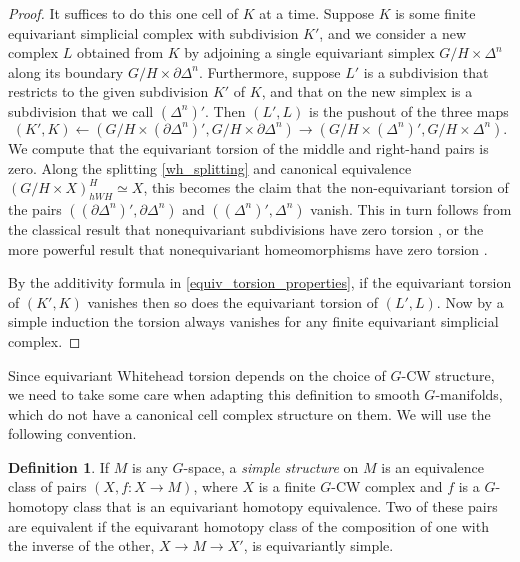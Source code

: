 \documentclass[11pt]{amsart}
\theoremstyle{definition}
\newtheorem{defn}{Definition}[section]
\numberwithin{equation}{section}
\numberwithin{figure}{section}
\newcommand{\ourdefn}[1]{{\it #1}}
\begin{document}
	\begin{proof}
		It suffices to do this one cell of $K$ at a time. Suppose $K$ is some finite equivariant simplicial complex with subdivision $K'$, and we consider a new complex $L$ obtained from $K$ by adjoining a single equivariant simplex $G/H \times \Delta^n$ along its boundary $G/H \times \partial \Delta^n$. Furthermore, suppose $L'$ is a subdivision that restricts to the given subdivision $K'$ of $K$, and that on the new simplex is a subdivision that we call $(\Delta^n)'$. Then $(L',L)$ is the pushout of the three maps
		\[ (K',K) \longleftarrow (G/H \times (\partial\Delta^n)',G/H \times \partial\Delta^n) \longrightarrow (G/H \times (\Delta^n)',G/H \times \Delta^n). \]
		We compute that the equivariant torsion of the middle and right-hand pairs is zero. Along the splitting \eqref{wh_splitting} and canonical equivalence $(G/H \times X)^H_{hWH} \simeq X$, this becomes the claim that the non-equivariant torsion of the pairs $((\partial\Delta^n)',\partial\Delta^n)$ and $((\Delta^n)',\Delta^n)$ vanish. This in turn follows from the classical result that nonequivariant subdivisions have zero torsion \cite{milnor_torsion}, or the more powerful result that nonequivariant homeomorphisms have zero torsion \cite{chapman}.
		
		By the additivity formula in \autoref{equiv_torsion_properties}, if the equivariant torsion of $(K',K)$ vanishes then so does the equivariant torsion of $(L',L)$. Now by a simple induction the torsion always vanishes for any finite equivariant simplicial complex.
	\end{proof}
	

Since equivariant Whitehead torsion depends on the choice of $G$-CW structure, we need to take some care when adapting this definition to smooth $G$-manifolds, which do not have a canonical cell complex structure on them. We will use the following convention.
\begin{defn}
	If $M$ is any $G$-space, a \ourdefn{simple structure} on $M$ is an equivalence class of pairs $(X,f\colon X \to M)$, where $X$ is a finite $G$-CW complex and $f$ is a $G$-homotopy class that is an equivariant homotopy equivalence. Two of these pairs are equivalent if the equivarant homotopy class of the composition of one with the inverse of the other, $X \to M \to X'$, is equivariantly simple.
\end{defn}
\end{document}
